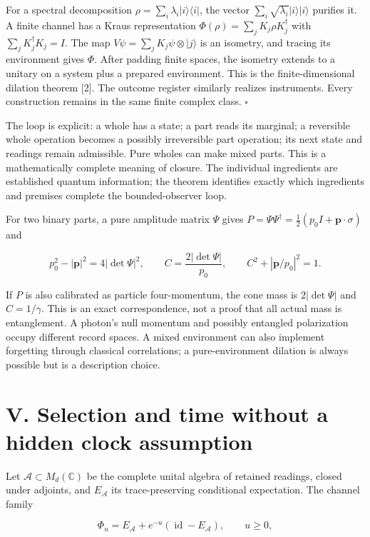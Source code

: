 \documentclass[
  11pt,
  a4paper,
]{article}
\begin{document}
For a spectral decomposition \(\rho=\sum_i\lambda_i|i\rangle\langle i|\), the vector \(\sum_i\sqrt{\lambda_i}|i\rangle|i\rangle\) purifies it. A finite channel has a Kraus representation \(\Phi(\rho)=\sum_jK_j\rho K_j^\dagger\) with \(\sum_jK_j^\dagger K_j=I\). The map \(V\psi=\sum_jK_j\psi\otimes|j\rangle\) is an isometry, and tracing its environment gives \(\Phi\). After padding finite spaces, the isometry extends to a unitary on a system plus a prepared environment. This is the finite-dimensional dilation theorem {[}2{]}. The outcome register similarly realizes instruments. Every construction remains in the same finite complex class. \(\square\)

The loop is explicit: a whole has a state; a part reads its marginal; a reversible whole operation becomes a possibly irreversible part operation; its next state and readings remain admissible. Pure wholes can make mixed parts. This is a mathematically complete meaning of closure. The individual ingredients are established quantum information; the theorem identifies exactly which ingredients and premises complete the bounded-observer loop.

For two binary parts, a pure amplitude matrix \(\Psi\) gives \(P=\Psi\Psi^\dagger=\tfrac12(p_0I+\mathbf p\cdot\sigma)\) and

\[p_0^2-|\mathbf p|^2=4|\det\Psi|^2,
\qquad C=\frac{2|\det\Psi|}{p_0},
\qquad C^2+|\mathbf p/p_0|^2=1.\]

If \(P\) is also calibrated as particle four-momentum, the cone mass is \(2|\det\Psi|\) and \(C=1/\gamma\). This is an exact correspondence, not a proof that all actual mass is entanglement. A photon's null momentum and possibly entangled polarization occupy different record spaces. A mixed environment can also implement forgetting through classical correlations; a pure-environment dilation is always possible but is a description choice.

\section{V. Selection and time without a hidden clock assumption}\label{v.-selection-and-time-without-a-hidden-clock-assumption}

Let \(\mathcal A\subset M_d(\mathbb C)\) be the complete unital algebra of retained readings, closed under adjoints, and \(E_{\mathcal A}\) its trace-preserving conditional expectation. The channel family

\[\Phi_u=E_{\mathcal A}+e^{-u}(\operatorname{id}-E_{\mathcal A}),\qquad u\ge0,\]
\end{document}
